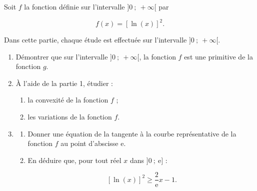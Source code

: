 \medskip

Soit $f$ la fonction définie sur l'intervalle $]0~;~+ \infty[$ par

\[f(x) = [\ln (x)]^2.\]

 Dans cette partie, chaque étude est effectuée sur l'intervalle $]0~;~+ \infty[$.

\medskip

\begin{enumerate}
\item Démontrer que sur l'intervalle $]0~;~+ \infty[$, la fonction $f$ est une primitive de la fonction $g$.
\item À l'aide de la partie 1, étudier :
	\begin{enumerate}
		\item la convexité de la fonction $f$ ;
		\item les variations de la fonction $f$.
\end{enumerate}
\item 
	\begin{enumerate}
		\item Donner une équation de la tangente à la courbe représentative de la fonction $f$ au point d'abscisse e.
		\item En déduire que, pour tout réel $x$ dans $]0~;~\text{e}]$ :
		
\[[\ln (x)]^2 \geqslant \dfrac{2}{\text{e}}x - 1.\]

	\end{enumerate}
\end{enumerate}
\bigskip
